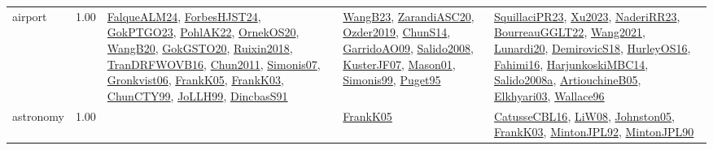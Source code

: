 {\begin{longtable}{p{3cm}r>{\raggedright\arraybackslash}p{6cm}>{\raggedright\arraybackslash}p{6cm}>{\raggedright\arraybackslash}p{8cm}}
\index{airport}\index{ApplicationAreas!airport}airport &  1.00 & \hyperref[detail:FalqueALM24]{FalqueALM24}, \hyperref[detail:ForbesHJST24]{ForbesHJST24}, \hyperref[detail:GokPTGO23]{GokPTGO23}, \hyperref[detail:PohlAK22]{PohlAK22}, \hyperref[detail:OrnekOS20]{OrnekOS20}, \hyperref[detail:WangB20]{WangB20}, \hyperref[detail:GokGSTO20]{GokGSTO20}, \hyperref[detail:Ruixin2018]{Ruixin2018}, \hyperref[detail:TranDRFWOVB16]{TranDRFWOVB16}, \hyperref[detail:Chun2011]{Chun2011}, \hyperref[detail:Simonis07]{Simonis07}, \hyperref[detail:Gronkvist06]{Gronkvist06}, \hyperref[detail:FrankK05]{FrankK05}, \hyperref[detail:FrankK03]{FrankK03}, \hyperref[detail:ChunCTY99]{ChunCTY99}, \hyperref[detail:JoLLH99]{JoLLH99}, \hyperref[detail:DincbasS91]{DincbasS91} & \hyperref[detail:WangB23]{WangB23}, \hyperref[detail:ZarandiASC20]{ZarandiASC20}, \hyperref[detail:Ozder2019]{Ozder2019}, \hyperref[detail:ChunS14]{ChunS14}, \hyperref[detail:GarridoAO09]{GarridoAO09}, \hyperref[detail:Salido2008]{Salido2008}, \hyperref[detail:KusterJF07]{KusterJF07}, \hyperref[detail:Mason01]{Mason01}, \hyperref[detail:Simonis99]{Simonis99}, \hyperref[detail:Puget95]{Puget95} & \hyperref[detail:SquillaciPR23]{SquillaciPR23}, \hyperref[detail:Xu2023]{Xu2023}, \hyperref[detail:NaderiRR23]{NaderiRR23}, \hyperref[detail:BourreauGGLT22]{BourreauGGLT22}, \hyperref[detail:Wang2021]{Wang2021}, \hyperref[detail:Lunardi20]{Lunardi20}, \hyperref[detail:DemirovicS18]{DemirovicS18}, \hyperref[detail:HurleyOS16]{HurleyOS16}, \hyperref[detail:Fahimi16]{Fahimi16}, \hyperref[detail:HarjunkoskiMBC14]{HarjunkoskiMBC14}, \hyperref[detail:Salido2008a]{Salido2008a}, \hyperref[detail:ArtiouchineB05]{ArtiouchineB05}, \hyperref[detail:Elkhyari03]{Elkhyari03}, \hyperref[detail:Wallace96]{Wallace96}\\
\index{astronomy}\index{ApplicationAreas!astronomy}astronomy &  1.00 &  & \hyperref[detail:FrankK05]{FrankK05} & \hyperref[detail:CatusseCBL16]{CatusseCBL16}, \hyperref[detail:LiW08]{LiW08}, \hyperref[detail:Johnston05]{Johnston05}, \hyperref[detail:FrankK03]{FrankK03}, \hyperref[detail:MintonJPL92]{MintonJPL92}, \hyperref[detail:MintonJPL90]{MintonJPL90}\\

\end{longtable}}
